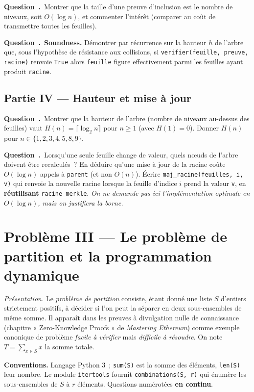 \documentclass[11pt,a4paper]{article}
\newcounter{qcnt}
\newcommand{\Q}{\medskip\par\stepcounter{qcnt}\noindent\textbf{Question~\theqcnt.}~}
\newcommand{\code}[1]{\lstinline!#1!}
\begin{document}
\Q Montrer que la taille d'une preuve d'inclusion est le nombre de niveaux, soit $O(\log n)$, et
commenter l'intérêt (comparer au coût de transmettre toutes les feuilles).

\Q \textbf{Soundness.} Démontrer par récurrence sur la hauteur $h$ de l'arbre que, sous
l'hypothèse de résistance aux collisions, si \code{verifier(feuille, preuve, racine)} renvoie
\code{True} alors \code{feuille} figure effectivement parmi les feuilles ayant produit
\code{racine}.

\subsection*{Partie IV --- Hauteur et mise à jour}

\Q Montrer que la hauteur de l'arbre (nombre de niveaux au-dessus des feuilles) vaut
$H(n) = \lceil \log_2 n \rceil$ pour $n \ge 1$ (avec $H(1)=0$). Donner $H(n)$ pour
$n \in \{1,2,3,4,5,8,9\}$.

\Q Lorsqu'une seule feuille change de valeur, quels n\oe uds de l'arbre doivent être recalculés~?
En déduire qu'une mise à jour de la racine coûte $O(\log n)$ appels à \code{parent} (et non
$O(n)$). Écrire \code{maj_racine(feuilles, i, v)} qui renvoie la nouvelle racine lorsque la feuille
d'indice $i$ prend la valeur \code{v}, en \textbf{réutilisant} \code{racine_merkle}. \emph{On ne
demande pas ici l'implémentation optimale en $O(\log n)$, mais on justifiera la borne.}

\clearpage
\section*{Problème III --- Le problème de partition et la programmation dynamique}
\noindent\emph{Présentation.} Le \emph{problème de partition} consiste, étant donné une liste $S$ d'entiers strictement
positifs, à décider si l'on peut la séparer en deux sous-ensembles de même somme. Il apparaît dans
les preuves à divulgation nulle de connaissance (chapitre « Zero-Knowledge Proofs » de
\emph{Mastering Ethereum}) comme exemple canonique de problème \emph{facile à vérifier} mais
\emph{difficile à résoudre}. On note $T = \sum_{x\in S} x$ la somme totale.

\noindent\textbf{Conventions.} Langage Python 3~; \code{sum(S)} est la somme des éléments,
\code{len(S)} leur nombre. Le module \code{itertools} fournit \code{combinations(S, r)} qui énumère
les sous-ensembles de $S$ à $r$ éléments. Questions numérotées \textbf{en continu}.
\end{document}
